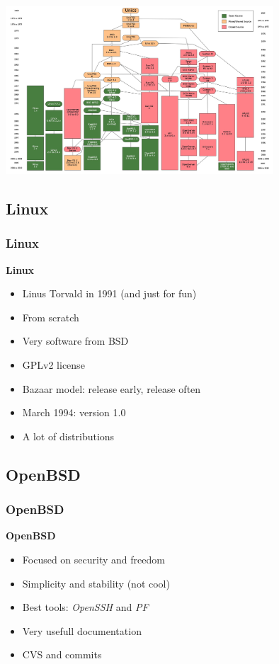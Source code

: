 \documentclass{beamer}
\begin{document}
\begin{frame}
  \includegraphics[width=10cm]{figs/Unix_history-simple.jpg}
\end{frame}
  \subsection{Linux}
  \begin{frame}
    \frametitle{Linux}
    \textbf{Linux}
    \begin{itemize}
      \item Linus Torvald in 1991 (and just for fun)
      \item From scratch
      \item Very software from BSD
      \item GPLv2 license
      \item Bazaar model: release early, release often
      \item March 1994: version 1.0
      \item A lot of distributions 
    \end{itemize}
  \end{frame}
  
  \subsection{OpenBSD}
  \begin{frame}
    \frametitle{OpenBSD}
    \textbf{OpenBSD}
    \begin{itemize}
      \item Focused on security and freedom
      \item Simplicity and stability (not cool)
      \item Best tools: \textit{OpenSSH} and \textit{PF}
      \item Very usefull documentation
      \item CVS and commits
    \end{itemize}
  \end{frame}
  
\end{document}
